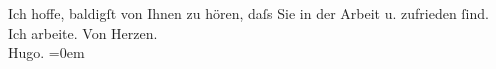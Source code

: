 \begin{ledgroupsized}[t]{13cm}
           \pstart
           Ich hoffe, baldigſt von Ihnen zu hören, daſs Sie in der Arbeit u. zufrieden ſind. Ich
               arbeite.\pend
           \pstart
           Von Herzen.{\\[\baselineskip]}\spacefill\mbox{Hugo.}\pend
           \leftskip=0em{}\endnumbering{}\end{ledgroupsized}  \newcommand{\dateiname}{L01776}\newcommand{\titel}{Hugo von Hofmannsthal an Arthur Schnitzler, 12. 6. 1908}\newcommand{\editorInnen}{Martin Anton Müller und Gerd-Hermann Susen}
      